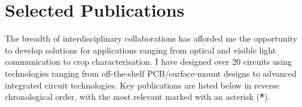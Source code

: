 \documentclass[a4paper,11pt]{article}
\begin{document}

\section{Selected Publications}

The breadth of interdisciplinary collaborations has afforded me the opportunity to develop solutions for applications ranging from optical and visible light communication to crop characterisation. I have designed over 20 circuits using technologies ranging from off-the-shelf PCB/surface-mount designs to advanced integrated circuit technologies. Key publications are listed below in reverse chronological order, with the most relevant marked with an asterisk (\textbf{*}).

\vspace{2mm}
\end{document}
